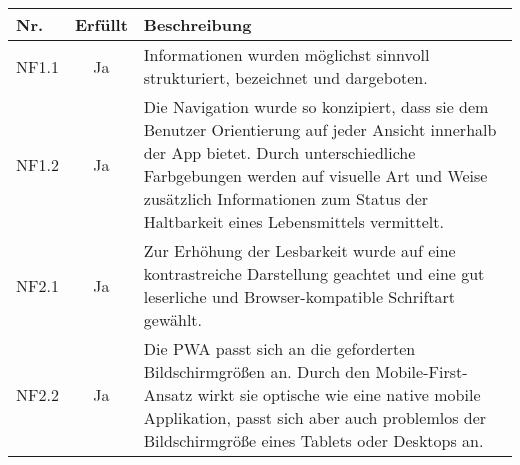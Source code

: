 \begin{tabular}{lcp{12.3cm}}
	\textbf{Nr.} & \textbf{Erfüllt} & \textbf{Beschreibung}\\
	\hline
	NF1.1 & Ja & Informationen wurden möglichst sinnvoll strukturiert, bezeichnet und dargeboten.\\
	NF1.2 & Ja & Die Navigation wurde so konzipiert, dass sie dem Benutzer Orientierung auf jeder Ansicht innerhalb der App bietet. Durch unterschiedliche Farbgebungen werden auf visuelle Art und Weise zusätzlich Informationen zum Status der Haltbarkeit eines Lebensmittels vermittelt.\\
	NF2.1 & Ja & Zur Erhöhung der Lesbarkeit wurde auf eine kontrastreiche Darstellung geachtet und eine gut leserliche und Browser-kompatible Schriftart gewählt.\\
	NF2.2 & Ja & Die PWA passt sich an die geforderten Bildschirmgrößen an. Durch den Mobile-First-Ansatz wirkt sie optische wie eine native mobile Applikation, passt sich aber auch problemlos der Bildschirmgröße eines Tablets oder Desktops an.\\
	
	
	

	\hline
\end{tabular}